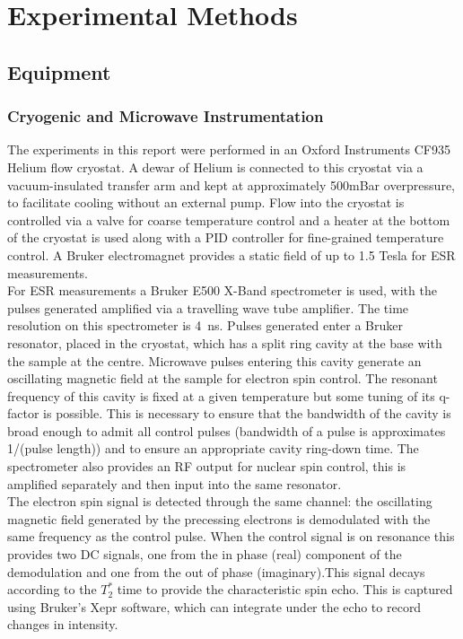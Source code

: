 \chapter{Experimental Methods}


\section{Equipment}
\subsection{Cryogenic and Microwave Instrumentation}

The experiments in this report were performed in an Oxford Instruments CF935 Helium flow cryostat.
A dewar of Helium is connected to this cryostat via a vacuum-insulated transfer arm and kept at approximately 500mBar overpressure, to facilitate cooling without an external pump.
Flow into the cryostat is controlled via a valve for coarse temperature control and a heater at the bottom of the cryostat is used along with a PID controller for fine-grained temperature control.
A Bruker electromagnet provides a static field of up to 1.5 Tesla for ESR measurements.
\\
For ESR measurements a Bruker E500 X-Band spectrometer is used, with the pulses generated amplified via a travelling wave tube amplifier.
The time resolution on this spectrometer is 4~ns.
Pulses generated enter a Bruker resonator, placed in the cryostat, which has a split ring cavity at the base with the sample at the centre.
Microwave pulses entering this cavity generate an oscillating magnetic field at the sample for electron spin control.
The resonant frequency of this cavity is fixed at a given temperature but some tuning of its q-factor is possible.
This is necessary to ensure that the bandwidth of the cavity is broad enough to admit all control pulses (bandwidth of a pulse is approximates 1/(pulse length)) and to ensure an appropriate cavity ring-down time.
The spectrometer also provides an RF output for nuclear spin control, this is amplified separately and then input into the same resonator.
\\
The electron spin signal is detected through the same channel: the oscillating magnetic field generated by the precessing electrons is demodulated with the same frequency as the control pulse.
When the control signal is on resonance this provides two DC signals, one from the in phase (real) component of the demodulation and one from the out of phase (imaginary).This signal decays according to the $T_2^*$ time to provide the characteristic spin echo.
This is captured using Bruker's Xepr software, which can integrate under the echo to record changes in intensity.

